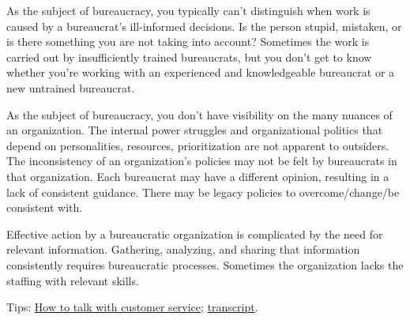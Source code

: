 As the subject of bureaucracy, you typically can't distinguish when work is caused by a bureaucrat's ill-informed decisions. Is the person stupid, mistaken, or is there something you are not taking into account?
Sometimes the work is carried out by insufficiently trained bureaucrats, but you don't get to know whether you're working with an experienced and knowledgeable bureaucrat or a new untrained bureaucrat. 

As the subject of bureaucracy, you don't have visibility on the many nuances of an organization. The internal power struggles and organizational politics that depend on personalities, resources, prioritization are not apparent to outsiders.
The inconsistency of an organization's policies may not be felt by bureaucrats in that organization. Each bureaucrat may have a different opinion, resulting in a lack of consistent guidance.
There may be legacy policies to overcome/change/be consistent with.

Effective action by a bureaucratic organization is complicated by the need for relevant information. Gathering, analyzing, and sharing that information consistently requires bureaucratic processes. Sometimes the organization lacks the staffing with relevant skills. 


Tips: \href{https://www.npr.org/2022/03/16/1086915600/get-what-you-want-customer-service}{How to talk with customer service}; \href{https://www.npr.org/transcripts/1086915600}{transcript}.